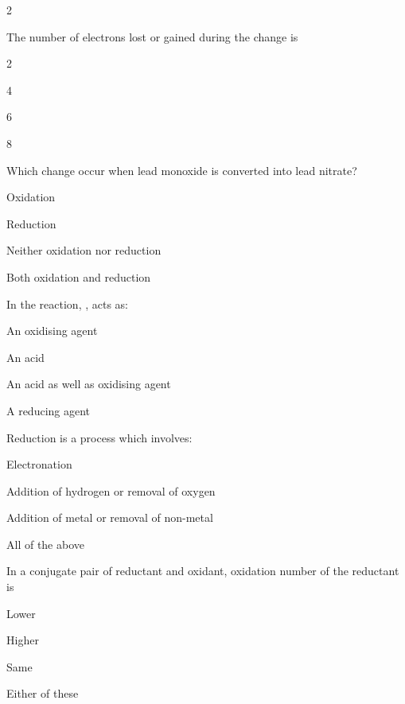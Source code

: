 \documentclass[10pt,a4paper]{article}
\begin{document}
\begin{multicols}{2}
\begin{questions}
\item The number of electrons lost or gained during the change  is
\begin{options}
  \item 2
  \item 4
  \item 6
  \item 8
\end{options}

\item Which change occur when lead monoxide is converted into lead nitrate?
\begin{options}
  \item Oxidation
  \item Reduction
  \item Neither oxidation nor reduction
  \item Both oxidation and reduction
\end{options}

\item In the reaction, ,  acts as:
\begin{options}
  \item An oxidising agent
  \item An acid
  \item An acid as well as oxidising agent
  \item A reducing agent
\end{options}

\item Reduction is a process which involves:
\begin{options}
  \item Electronation
  \item Addition of hydrogen or removal of oxygen
  \item Addition of metal or removal of non-metal
  \item All of the above
\end{options}

\item In a conjugate pair of reductant and oxidant, oxidation number of the reductant is
\begin{options}
  \item Lower
  \item Higher
  \item Same
  \item Either of these
\end{options}


\end{questions}
\end{multicols}
\end{document}
